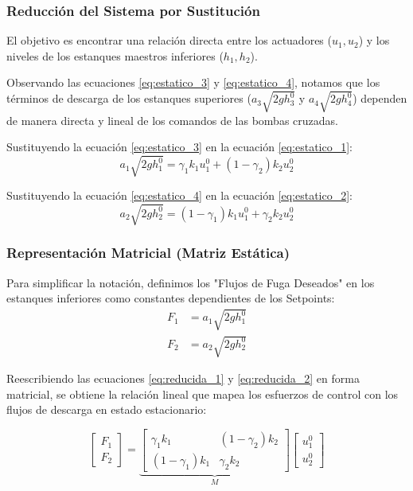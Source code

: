 \subsubsection{Reducción del Sistema por Sustitución}
El objetivo es encontrar una relación directa entre los actuadores ($u_1, u_2$) y los niveles de los estanques maestros inferiores ($h_1, h_2$). 

Observando las ecuaciones \eqref{eq:estatico_3} y \eqref{eq:estatico_4}, notamos que los términos de descarga de los estanques superiores ($a_3 \sqrt{2g h_3^0}$ y $a_4 \sqrt{2g h_4^0}$) dependen de manera directa y lineal de los comandos de las bombas cruzadas.

Sustituyendo la ecuación \eqref{eq:estatico_3} en la ecuación \eqref{eq:estatico_1}:
\begin{equation}
a_1 \sqrt{2g h_1^0} = \gamma_1 k_1 u_1^0 + (1-\gamma_2) k_2 u_2^0
\label{eq:reducida_1}
\end{equation}

Sustituyendo la ecuación \eqref{eq:estatico_4} en la ecuación \eqref{eq:estatico_2}:
\begin{equation}
a_2 \sqrt{2g h_2^0} = (1-\gamma_1) k_1 u_1^0 + \gamma_2 k_2 u_2^0
\label{eq:reducida_2}
\end{equation}

\subsubsection{Representación Matricial (Matriz Estática)}
Para simplificar la notación, definimos los "Flujos de Fuga Deseados" en los estanques inferiores como constantes dependientes de los Setpoints:
\begin{align*}
F_1 &= a_1 \sqrt{2g h_1^0} \\
F_2 &= a_2 \sqrt{2g h_2^0}
\end{align*}

Reescribiendo las ecuaciones \eqref{eq:reducida_1} y \eqref{eq:reducida_2} en forma matricial, se obtiene la relación lineal que mapea los esfuerzos de control con los flujos de descarga en estado estacionario:

\begin{equation}
\begin{bmatrix} F_1 \\ F_2 \end{bmatrix} = 
\underbrace{
\begin{bmatrix} 
\gamma_1 k_1 & (1-\gamma_2) k_2 \\ 
(1-\gamma_1) k_1 & \gamma_2 k_2 
\end{bmatrix}
}_{M}
\begin{bmatrix} u_1^0 \\ u_2^0 \end{bmatrix}
\label{eq:matriz_estatica}
\end{equation}

